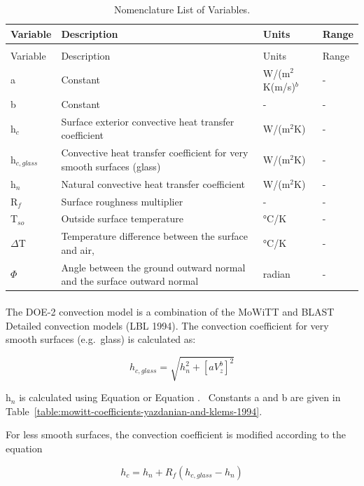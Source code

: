 \begin{longtable}[c]{p{0.5in}p{3.0in}p{1.5in}p{1.0in}}

\caption{Nomenclature List of Variables. \label{table:nomenclature-list-of-variables.-003}} \tabularnewline
\toprule 
Variable & Description & Units & Range \tabularnewline
\midrule
\endfirsthead

\caption[]{Nomenclature List of Variables.} \tabularnewline
\toprule 
Variable & Description & Units & Range \tabularnewline
\midrule
\endhead

a & Constant & W/(m\(^{2}\)K(m/s)\(^{b}\) & - \tabularnewline
b & Constant & - & - \tabularnewline
h\(_{c}\) & Surface exterior convective heat transfer coefficient & W/(m\(^{2}\)K) & - \tabularnewline
h\(_{c,glass}\) & Convective heat transfer coefficient for very smooth surfaces (glass) & W/(m\(^{2}\)K) & - \tabularnewline
h\(_{n}\) & Natural convective heat transfer coefficient & W/(m\(^{2}\)K) & - \tabularnewline
R\(_{f}\) & Surface roughness multiplier & - & - \tabularnewline
T\(_{so}\) & Outside surface temperature & °C/K & - \tabularnewline
$\Delta$T & Temperature difference between the surface and air, & °C/K & - \tabularnewline
$\Phi$ & Angle between the ground outward normal and the surface outward normal & radian & - \tabularnewline
\bottomrule
\end{longtable}

\paragraph{}\label{section}

The DOE-2 convection model is a combination of the MoWiTT and BLAST Detailed convection models (LBL 1994). The convection coefficient for very smooth surfaces (e.g.~glass) is calculated as:

\begin{equation}
{h_{c,glass}} = \sqrt {h_n^2 + {{\left[ {aV_z^b} \right]}^2}}
\end{equation}

h\(_{n}\) is calculated using Equation or Equation .~ Constants a and b are given in Table~\ref{table:mowitt-coefficients-yazdanian-and-klems-1994}.

For less smooth surfaces, the convection coefficient is modified according to the equation

\begin{equation}
{h_c} = {h_n} + {R_f}({h_{c,glass}} - {h_n})
\end{equation}

